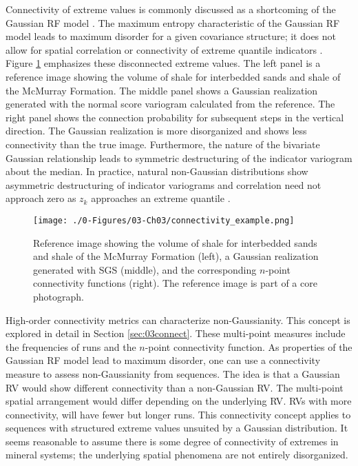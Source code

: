 Connectivity of extreme values is commonly discussed as a shortcoming of the Gaussian \gls{RF} model \citep{journel1993entropy,journel1989nongaussian,yan2020multivariate,guthke2017link,kerrou2008issues}. The maximum entropy characteristic of the Gaussian \gls{RF} model leads to maximum disorder for a given covariance structure; it does not allow for spatial correlation or connectivity of extreme quantile indicators \citep{kerrou2008issues}. Figure \ref{fig:connectivity_example} emphasizes these disconnected extreme values. The left panel is a reference image showing the volume of shale for interbedded sands and shale of the McMurray Formation. The middle panel shows a Gaussian realization generated with the normal score variogram calculated from the reference. The right panel shows the connection probability for subsequent steps in the vertical direction. The Gaussian realization is more disorganized and shows less connectivity than the true image. Furthermore, the nature of the bivariate Gaussian relationship leads to symmetric destructuring of the indicator variogram about the median. In practice, natural non-Gaussian distributions show asymmetric destructuring of indicator variograms \citep{vincent2021multipleindicator} and correlation need not approach zero as $z_{k}$ approaches an extreme quantile \citep{journel1989nongaussian}.

\begin{figure}[htb!]
    \centering
    \texttt{[image: ./0-Figures/03-Ch03/connectivity\_example.png]}
    \caption{Reference image showing the volume of shale for interbedded sands and shale of the McMurray Formation (left), a Gaussian realization generated with \gls{SGS} (middle), and the corresponding $n$-point connectivity functions (right). The reference image is part of a core photograph.}
    \label{fig:connectivity_example}
\end{figure}

High-order connectivity metrics can characterize non-Gaussianity. This concept is explored in detail in Section \ref{sec:03connect}. These multi-point measures include the frequencies of runs and the $n$-point connectivity function. As properties of the Gaussian \gls{RF} model lead to maximum disorder, one can use a connectivity measure to assess non-Gaussianity from sequences. The idea is that a Gaussian \gls{RV} would show different connectivity than a non-Gaussian \gls{RV}. The multi-point spatial arrangement would differ depending on the underlying \gls{RV}. \Glspl{RV} with more connectivity, will have fewer but longer runs. This connectivity concept applies to sequences with structured extreme values unsuited by a Gaussian distribution. It seems reasonable to assume there is some degree of connectivity of extremes in mineral systems; the underlying spatial phenomena are not entirely disorganized.

